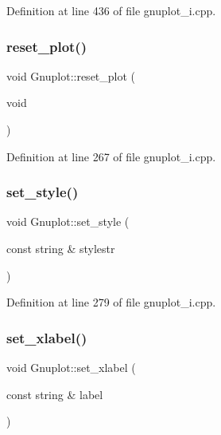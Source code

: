 Definition at line 436 of file gnuplot\+\_\+i.\+cpp.

\mbox{\label{class_gnuplot_ad54976652afe30231a850dd31e1ca70f}} 
\subsubsection{\texorpdfstring{reset\+\_\+plot()}{reset\_plot()}}
{\footnotesize\ttfamily void Gnuplot\+::reset\+\_\+plot (\begin{DoxyParamCaption}\item[{void}]{ }\end{DoxyParamCaption})}



Definition at line 267 of file gnuplot\+\_\+i.\+cpp.

\mbox{\label{class_gnuplot_accdd7b69237ead4109c74e1e440c185f}} 
\subsubsection{\texorpdfstring{set\+\_\+style()}{set\_style()}}
{\footnotesize\ttfamily void Gnuplot\+::set\+\_\+style (\begin{DoxyParamCaption}\item[{const string \&}]{stylestr }\end{DoxyParamCaption})}



Definition at line 279 of file gnuplot\+\_\+i.\+cpp.

\mbox{\label{class_gnuplot_ac9b0c04d47e375eb82f50437eda5e46e}} 
\subsubsection{\texorpdfstring{set\+\_\+xlabel()}{set\_xlabel()}}
{\footnotesize\ttfamily void Gnuplot\+::set\+\_\+xlabel (\begin{DoxyParamCaption}\item[{const string \&}]{label }\end{DoxyParamCaption})}



